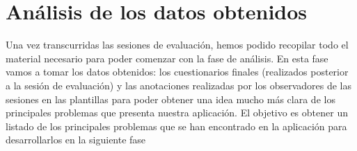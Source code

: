 \section{Análisis de los datos obtenidos}
Una vez transcurridas las sesiones de evaluación, hemos podido recopilar todo el material necesario para poder comenzar
con la fase de análisis. En esta fase vamos a tomar los datos obtenidos: los cuestionarios finales (realizados posterior a
la sesión de evaluación) y las anotaciones realizadas por los observadores de las sesiones en las plantillas para poder obtener
una idea mucho más clara de los principales problemas que presenta nuestra aplicación. El objetivo es obtener un listado de los
principales problemas que se han encontrado en la aplicación para desarrollarlos en la siguiente fase \\

